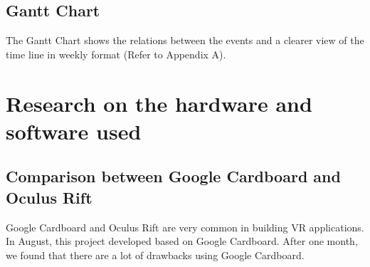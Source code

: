 \documentclass{article}
\begin{document}
\subsection{Gantt Chart}
The Gantt Chart shows the relations between the events and a clearer view of the time line in weekly format (Refer to Appendix A).

\clearpage

\section{Research on the hardware and software used}
\subsection{Comparison between Google Cardboard and Oculus Rift}
Google Cardboard\citep{cardboard} and Oculus Rift\citep{oculus} are very common in building VR applications. In August, this project developed based on Google Cardboard. After one month, we found that there are a lot of drawbacks using Google Cardboard.
\end{document}
